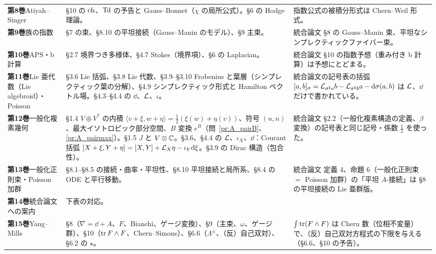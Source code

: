 \begin{longtable}{@{}p{2.2cm}p{7.2cm}p{5.6cm}@{}}
\textbf{第8巻}\newline Atiyah--Singer & §10 の $\mathrm{ch}$、$\mathrm{Td}$ の予告と Gauss--Bonnet（$\chi$ の局所公式）。§6 の Hodge 理論。 & 指数公式の被積分形式は Chern--Weil 形式。 \\
\textbf{第9巻}\newline 族の指数 & §7 の束、§8.10 の平坦接続（Gauss--Manin のモデル）、§9 主束。 & 統合論文 §8 の Gauss--Manin 束、平坦なシンプレクティックファイバー束。 \\
\textbf{第10巻}\newline APS・b 計算 & §2.7 境界つき多様体、§4.7 Stokes（境界項）、§6 の Laplacian。 & 統合論文 §10 の指数予想（重み付き b 計算）は予想にとどまる。 \\
\textbf{第11巻}\newline Lie 亜代数（Lie algebroid）・Poisson & §3.6 Lie 括弧、§3.8 Lie 代数、§3.9--§3.10 Frobenius と葉層（シンプレクティック葉の分解）、§4.9 シンプレクティック形式と Hamilton ベクトル場。§4.3--§4.4 の $\dd$、$\mathcal L$、$\iota$。 & 統合論文の記号表の括弧 $[a,b]_\sigma=\mathcal L_{\sigma^\sharp a}b-\mathcal L_{\sigma^\sharp b}a-\mathrm{d}\sigma(a,b)$ は $\mathcal L$、$\dd$ だけで書かれている。 \\
\textbf{第12巻}\newline 一般化複素幾何 & §1.4 $V\oplus V^*$ の内積 $\langle v+\xi,w+\eta\rangle=\frac12(\xi(w)+\eta(v))$、符号 $(n,n)$、最大イソトロピック部分空間、$B$ 変換 $e^B$（問~\ref{pr:A_pairB}、\ref{pr:A_pairmax}）。§1.5 $J$ と $V\otimes\mathbb C$。§3.6、§4.4 の $\mathcal L$、$\iota_X$、$\dd$：Courant 括弧 $[X+\xi,Y+\eta]=[X,Y]+\mathcal L_X\eta-\iota_Y\mathrm{d}\xi$。§3.9 の Dirac 構造（包合性）。 & 統合論文 §2.2（一般化複素構造の定義、$\beta$ 変換）の記号表と同じ記号・係数 $\frac12$ を使った。 \\
\textbf{第13巻}\newline 一般化正則束・Poisson 加群 & §8.1--§8.5 の接続・曲率・平坦性、§8.10 平坦接続と局所系、§8.4 の ODE と平行移動。 & 統合論文 定義 4、命題 6（一般化正則束 $=$ Poisson 加群）の「平坦 $A$-接続」は §8 の平坦接続の Lie 亜群版。 \\
\textbf{第14巻}\newline 統合論文への案内 & 下表の対応。 & \\
\textbf{第15巻}\newline Yang--Mills & §8（$\nabla=\dd+A$、$F$、Bianchi、ゲージ変換）、§9（主束、$\omega$、ゲージ群）、§10（$\operatorname{tr} F\wedge F$、Chern--Simons）、§6.6（$\Lambda^\pm$、（反）自己双対）、§6.2 の $\star$。 & $\int\operatorname{tr}(F\wedge F)$ は Chern 数（位相不変量）で、（反）自己双対方程式の下限を与える（§6.6、§10 の予告）。 \\

\end{longtable}
